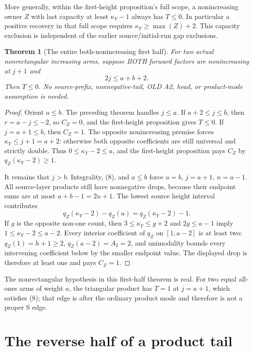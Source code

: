 \documentclass[11pt]{article}
\newtheorem{theorem}[proposition]{Theorem}
\begin{document}
More generally, within the first-height proposition's full scope,
a nonincreasing owner $Z$ with last capacity at least
$\kappa_Y-1$ always has $T\le0$. In particular a positive
recovery in that full scope requires
$\kappa_Y\ge\max(Z)+2$. This capacity exclusion is independent
of the earlier source/initial-run gap exclusions.

\begin{theorem}[The entire both-nonincreasing first half]
For two actual nonrectangular increasing arms, suppose BOTH forward
factors are nonincreasing at $j+1$ and
\[
                             2j\le a+b+2.           \tag{8}
\]
Then $T\le0$. No source-prefix, nonnegative-tail, OLD A2,
head, or product-mode assumption is needed.
\end{theorem}
\begin{proof}
Orient $a\le b$. The preceding theorem handles $j\le a$.
If $a+2\le j\le b$, then $r=a-j\le-2$, so $C_Z=0$,
and the first-height proposition gives $T\le0$.
If $j=a+1\le b$, then $C_Z=1$. The opposite nonincreasing
premise forces $\kappa_Y\le j+1=a+2$: otherwise both opposite
coefficients are still universal and strictly double.
Thus $0\le\kappa_Y-2\le a$, and the first-height proposition
pays $C_Z$ by $q_Z(\kappa_Y-2)\ge1$.

It remains that $j>b$. Integrality, (8), and $a\le b$ force
$a=b$, $j=a+1$, $n=a-1$. All source-layer products still
have nonnegative drops, because their endpoint sums are at most
$a+b-1=2n+1$. The lowest source height interval contributes
\[
 q_Z(\kappa_Y-2)-q_Z(a)=q_Z(\kappa_Y-2)-1.
\]
If $g$ is the opposite non-one count, then
$3\le\kappa_Y\le g+2$ and $2g\le a-1$ imply
$1\le\kappa_Y-2\le a-2$.
Every interior coefficient of $q_Z$ on $[1,a-2]$ is at
least two: $q_Z(1)=h+1\ge2$, $q_Z(a-2)=A_2=2$, and
unimodality bounds every intervening coefficient below by
the smaller endpoint value. The displayed drop is therefore
at least one and pays $C_Z=1$.
\end{proof}

The nonrectangular hypothesis in this first-half theorem is real.
For two equal all-ones arms of weight $a$, the triangular product
has $T=1$ at $j=a+1$, which satisfies (8); that edge is after
the ordinary product mode and therefore is not a proper S edge.

\section{The reverse half of a product tail}
\end{document}
